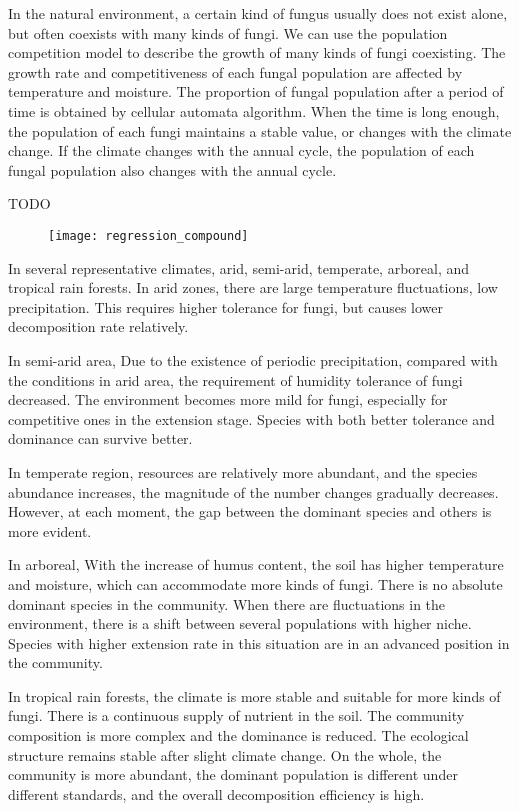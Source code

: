 \documentclass{mcmthesis}
\begin{document}
\begin{appendices}
In the natural environment, a certain kind of fungus usually does not exist alone, but often coexists with many kinds of fungi. We can use the population competition model to describe the growth of many kinds of fungi coexisting. The growth rate and competitiveness of each fungal population are affected by temperature and moisture. The proportion of fungal population after a period of time is obtained by cellular automata algorithm. When the time is long enough, the population of each fungi maintains a stable value, or changes with the climate change. If the climate changes with the annual cycle, the population of each fungal population also changes with the annual cycle.

TODO

\begin{figure}[H]
  \small
  \centering
  \texttt{[image: regression\_compound]}
  \label{regression_compound}
\end{figure}

In several representative climates, arid, semi-arid, temperate, arboreal, and tropical rain forests. In arid zones, there are large temperature fluctuations, low precipitation. This requires higher tolerance for fungi, but causes lower decomposition rate relatively. 

In semi-arid area, Due to the existence of periodic precipitation, compared with the conditions in arid area, the requirement of humidity tolerance of fungi decreased. The environment becomes more mild for fungi, especially for competitive ones in the extension stage. Species with both better tolerance and dominance can survive better.

In temperate region, resources are relatively more abundant, and the species abundance increases, the magnitude of the number changes gradually decreases. However, at each moment, the gap between the dominant species and others is more evident. 

In arboreal, With the increase of humus content, the soil has higher temperature and moisture, which can accommodate more kinds of fungi. There is no absolute dominant species in the community. When there are fluctuations in the environment, there is a shift between several populations with higher niche. Species with higher extension rate in this situation are in an advanced position in the community.

In tropical rain forests, the climate is more stable and suitable for more kinds of fungi. There is a continuous supply of nutrient in the soil. The community composition is more complex and the dominance is reduced. The ecological structure remains stable after slight climate change. On the whole, the community is more abundant, the dominant population is different under different standards, and the overall decomposition efficiency is high.


\end{appendices}
\end{document}
